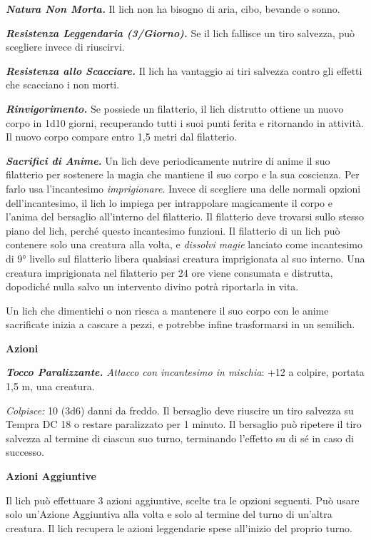 \begin{multicols}{2}
\emph{\textbf{Natura Non Morta.}} Il lich non ha bisogno di aria, cibo,
bevande o sonno.

\emph{\textbf{Resistenza Leggendaria (3/Giorno).}} Se il lich fallisce
un tiro salvezza, può scegliere invece di riuscirvi.

\emph{\textbf{Resistenza allo Scacciare.}} Il lich ha vantaggio ai tiri
salvezza contro gli effetti che scacciano i non morti.

\emph{\textbf{Rinvigorimento.}} Se possiede un filatterio, il lich
distrutto ottiene un nuovo corpo in 1d10 giorni, recuperando tutti i
suoi punti ferita e ritornando in attività. Il nuovo corpo compare entro
1,5 metri dal filatterio.

\emph{\textbf{Sacrifici di Anime.}} Un lich deve periodicamente nutrire
di anime il suo filatterio per sostenere la magia che mantiene il suo
corpo e la sua coscienza. Per farlo usa l'incantesimo
\emph{imprigionare}. Invece di scegliere una delle normali opzioni
dell'incantesimo, il lich lo impiega per intrappolare magicamente il
corpo e l'anima del bersaglio all'interno del filatterio. Il filatterio
deve trovarsi sullo stesso piano del lich, perché questo incantesimo
funzioni. Il filatterio di un lich può contenere solo una creatura alla
volta, e \emph{dissolvi magie} lanciato come incantesimo di 9° livello
sul filatterio libera qualsiasi creatura imprigionata al suo interno.
Una creatura imprigionata nel filatterio per 24 ore viene consumata e
distrutta, dopodiché nulla salvo un intervento divino potrà riportarla
in vita.

Un lich che dimentichi o non riesca a mantenere il suo corpo con le
anime sacrificate inizia a cascare a pezzi, e potrebbe infine
trasformarsi in un semilich.

\textbf{Azioni}

\emph{\textbf{Tocco Paralizzante.} Attacco con incantesimo in mischia}:
+12 a colpire, portata 1,5 m, una creatura.

\emph{Colpisce:} 10 (3d6) danni da freddo. Il bersaglio deve riuscire un
tiro salvezza su Tempra DC 18 o restare paralizzato per 1 minuto.
Il bersaglio può ripetere il tiro salvezza al termine di ciascun suo
turno, terminando l'effetto su di sé in caso di successo.

\textbf{Azioni Aggiuntive}

Il lich può effettuare 3 azioni aggiuntive, scelte tra le opzioni
seguenti. Può usare solo un'Azione Aggiuntiva alla volta e solo al
termine del turno di un'altra creatura. Il lich recupera le azioni
leggendarie spese all'inizio del proprio turno.


\end{multicols}
